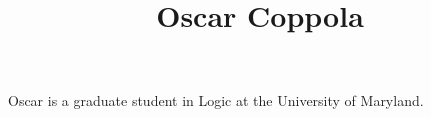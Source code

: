 \documentclass[a4paper]{article}
\title{Oscar Coppola}
\date{}
\begin{document}
\maketitle
\par{Oscar is a graduate student in Logic at the University of Maryland.}
\printbibliography
\end{document}
